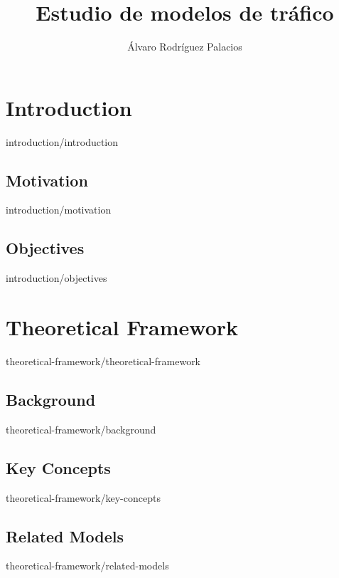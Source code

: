 \documentclass[epsbased,copyright,final,covers,extendedindex,firstnumbered,tfm,gnuplot,english]{tfgtfmthesisuam}
\title{Estudio de modelos de tráfico}
\author{Álvaro Rodríguez Palacios}
\begin{document}

\chapter{Introduction\label{CAP:INTRODUCCION}}{introduction/introduction}
  \section{Motivation\label{SEC:MOTIVACION}}{introduction/motivation}
  \section{Objectives\label{SEC:OBJETIVOS}}{introduction/objectives}

\chapter{Theoretical Framework\label{CAP:THEORETICALFRAMEWORK}}{theoretical-framework/theoretical-framework}
  \section{Background\label{SEC:BACKGROUND}}{theoretical-framework/background}
  \section{Key Concepts\label{SEC:KEYCONCEPTS}}{theoretical-framework/key-concepts}
  \section{Related Models\label{SEC:SIMULATIONMODEL}}{theoretical-framework/related-models}
\end{document}
